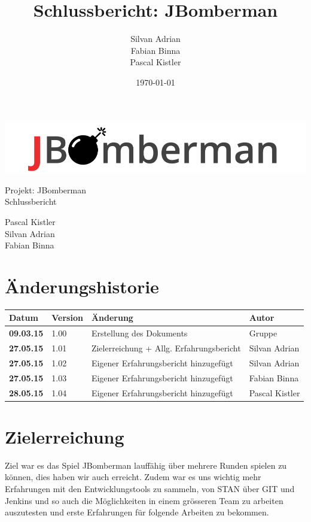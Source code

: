\documentclass[11pt]{scrartcl}
\title{Schlussbericht: JBomberman}
\author{Silvan Adrian \\ Fabian Binna \\ Pascal Kistler}
\date{\today{}}
\begin{document}
\def\arraystretch{1.5}
\begin{titlepage}
\begin{center}
\vspace{10em}
\includegraphics[scale=2]{jbomberman}
\vspace{10em}
\end{center}
\begin{center}
\huge {Projekt: JBomberman} \\
\huge {Schlussbericht}
\end{center}
\begin{center}
\vspace{10em}
\LARGE {Pascal Kistler} \\
\LARGE {Silvan Adrian} \\
\LARGE {Fabian Binna}
\end{center}

\end{titlepage}

\newpage
\section{Änderungshistorie}
\label{sec:Änderungen}

\begin{tabularx}{\linewidth}{l l X l}
\textbf{Datum} & \textbf{Version} & \textbf{Änderung}  & \textbf{Autor} \\
\hline
\textbf{09.03.15} & 1.00 & Erstellung des Dokuments & Gruppe \\
\textbf{27.05.15} & 1.01 & Zielerreichung + Allg. Erfahrungsbericht & Silvan 
Adrian\\
\textbf{27.05.15} & 1.02 & Eigener Erfahrungsbericht hinzugefügt & Silvan 
Adrian\\
\textbf{27.05.15} & 1.03 & Eigener Erfahrungsbericht hinzugefügt & Fabian Binna\\
\textbf{28.05.15} & 1.04 & Eigener Erfahrungsbericht hinzugefügt & Pascal 
Kistler\\
\end{tabularx}

\newpage
\tableofcontents
\newpage

\section{Zielerreichung}
Ziel war es das Spiel JBomberman lauffähig über mehrere Runden spielen zu 
können, dies haben wir auch erreicht.
Zudem war es uns wichtig mehr Erfahrungen mit den Entwicklungstools zu sammeln,
von STAN über GIT und Jenkins und so auch die Möglichkeiten 
in einem grösseren Team zu arbeiten auszutesten und erste Erfahrungen 
für folgende Arbeiten zu bekommen.
\end{document}
